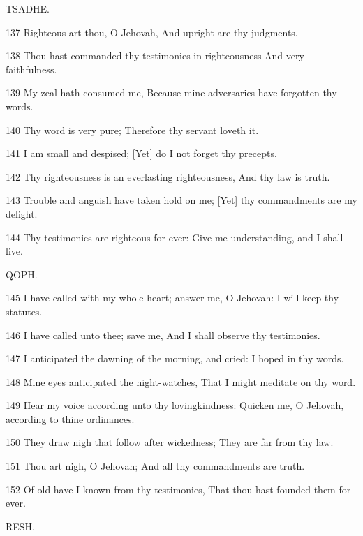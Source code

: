 \par TSADHE.

\par 137 Righteous art thou, O Jehovah, And upright are thy judgments.
\par 138 Thou hast commanded thy testimonies in righteousness And very faithfulness.
\par 139 My zeal hath consumed me, Because mine adversaries have forgotten thy words.
\par 140 Thy word is very pure; Therefore thy servant loveth it.
\par 141 I am small and despised; [Yet] do I not forget thy precepts.
\par 142 Thy righteousness is an everlasting righteousness, And thy law is truth.
\par 143 Trouble and anguish have taken hold on me; [Yet] thy commandments are my delight.
\par 144 Thy testimonies are righteous for ever: Give me understanding, and I shall live.

\par QOPH.

\par 145 I have called with my whole heart; answer me, O Jehovah: I will keep thy statutes.
\par 146 I have called unto thee; save me, And I shall observe thy testimonies.
\par 147 I anticipated the dawning of the morning, and cried: I hoped in thy words.
\par 148 Mine eyes anticipated the night-watches, That I might meditate on thy word.
\par 149 Hear my voice according unto thy lovingkindness: Quicken me, O Jehovah, according to thine ordinances.
\par 150 They draw nigh that follow after wickedness; They are far from thy law.
\par 151 Thou art nigh, O Jehovah; And all thy commandments are truth.
\par 152 Of old have I known from thy testimonies, That thou hast founded them for ever.

\par RESH.

